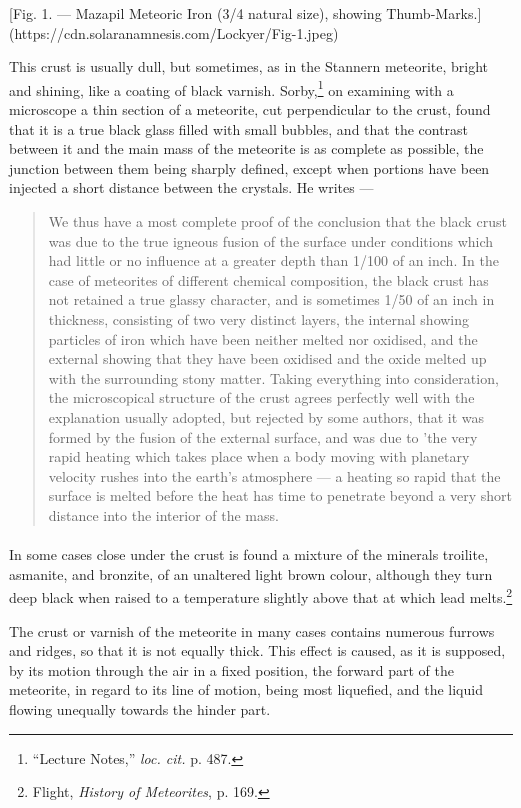 \documentclass[a4paper, 12pt, oneside, polutonikogreek, english]{article}
\begin{document}
[Fig. 1. --- Mazapil Meteoric Iron (3/4 natural size), showing Thumb-Marks.](https://cdn.solaranamnesis.com/Lockyer/Fig-1.jpeg)

This crust is usually dull, but sometimes, as in the Stannern meteorite, bright and shining, like a coating of black varnish. Sorby,\footnote{``Lecture Notes,'' \emph{loc. cit.} p. 487.} on examining with a microscope a thin section of a meteorite, cut perpendicular to the crust, found that it is a true black glass filled with small bubbles, and that the contrast between it and the main mass of the meteorite is as complete as possible, the junction between them being sharply defined, except when portions have been injected a short distance between the crystals. He writes ---
\begin{quotation}
We thus have a most complete proof of the conclusion that the black crust was due to the true igneous fusion of the surface under conditions which had little or no influence at a greater depth than 1/100 of an inch. In the case of meteorites of different chemical composition, the black crust has not retained a true glassy character, and is sometimes 1/50 of an inch in thickness, consisting of two very distinct layers, the internal showing particles of iron which have been neither melted nor oxidised, and the external showing that they have been oxidised and the oxide melted up with the surrounding stony matter. Taking everything into consideration, the microscopical structure of the crust agrees perfectly well with the explanation usually adopted, but rejected by some authors, that it was formed by the fusion of the external surface, and was due to 'the very rapid heating which takes place when a body moving with planetary velocity rushes into the earth's atmosphere --- a heating so rapid that the surface is melted before the heat has time to penetrate beyond a very short distance into the interior of the mass.
\end{quotation}
\paragraph{}
In some cases close under the crust is found a mixture of the minerals troilite, asmanite, and bronzite, of an unaltered light brown colour, although they turn deep black when raised to a temperature slightly above that at which lead melts.\footnote{Flight, \emph{History of Meteorites}, p. 169.}

The crust or varnish of the meteorite in many cases contains numerous furrows and ridges, so that it is not equally thick. This effect is caused, as it is supposed, by its motion through the air in a fixed position, the forward part of the meteorite, in regard to its line of motion, being most liquefied, and the liquid flowing unequally towards the hinder part.
\end{document}

